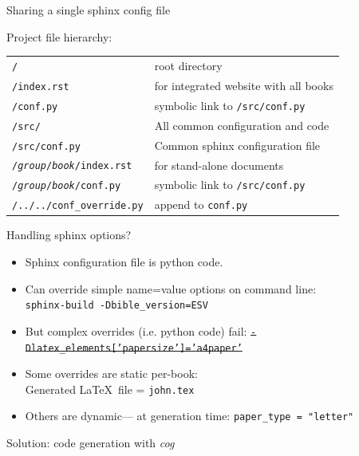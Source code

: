 \documentclass{beamer}
\begin{document}
\begin{frame}[fragile]{Sharing a single sphinx config file}

Project file hierarchy:

\begin{tabular}{|l|l|}
\hline
\texttt{/} & root directory \\
\texttt{/index.rst} & for integrated website with all books \\
\texttt{/conf.py} & symbolic link to \texttt{/src/conf.py}\\
\hline
\texttt{/src/} & All common configuration and code\\
\texttt{/src/conf.py} & Common sphinx configuration file\\
\hline
\texttt{/\emph{group}/\emph{book}/index.rst} & for stand-alone documents\\
\texttt{/\emph{group}/\emph{book}/conf.py} & symbolic link to \texttt{/src/conf.py}\\
\texttt{/../../conf\_override.py} & append to \texttt{conf.py}\\
\hline
\end{tabular}


\end{frame}

\begin{frame}[fragile]{Handling sphinx options?}

\begin{itemize}
\item Sphinx configuration file is python code.

\item Can override simple name=value options on command line:\\
\texttt{sphinx-build -Dbible\_version=ESV}

\item But complex overrides (i.e. python code) fail:
\sout{\texttt{-Dlatex\_elements['papersize']='a4paper'}}

\item Some overrides are static per-book:\\
Generated \LaTeX\ file = \texttt{john.tex}

\item Others are dynamic--- at generation time:
\texttt{paper\_type = "letter"}
\end{itemize}

Solution: code generation with \emph{cog}
\end{frame}
\end{document}
